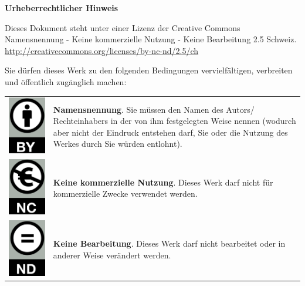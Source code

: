 \documentclass[11pt, twoside, a4paper]{book}		%
\begin{document}
\begin{titlepage}
	\clearpage
	\pagestyle{empty}
	\mbox{}
	\clearpage
	\pagestyle{empty}
	\centering
	
	\textbf{Urheberrechtlicher Hinweis}

	\hspace{1cm}

	Dieses Dokument steht unter einer Lizenz der Creative Commons Namensnennung - Keine kommerzielle Nutzung - Keine Bearbeitung 2.5 Schweiz.\\ \url{http://creativecommons.org/licenses/by-nc-nd/2.5/ch}
	
	\hspace{1cm}

	\RaggedRight Sie dürfen dieses Werk zu den folgenden Bedingungen vervielfältigen, verbreiten und öffentlich zugänglich machen:

	\begin{table}[h]
		\centering
		\small
		\begin{tabular}{c m{}}
			\raisebox{-.47\height} 	{\includegraphics[width=.1\textwidth]{png/CC_by_me}}
			&
			\textbf{Namensnennung}. Sie müssen den Namen des Autors/ Rechteinhabers in der von ihm festgelegten Weise nennen (wodurch aber nicht der Eindruck entstehen darf, Sie oder die Nutzung des Werkes durch Sie würden entlohnt). \\
			\rule{0pt}{9ex}%
			\raisebox{-.5\height} {\includegraphics[width=.1\textwidth]{png/CC_nc_me}}
			&
			\textbf{Keine kommerzielle Nutzung}. Dieses Werk darf nicht für kommerzielle Zwecke verwendet werden. \\
			\rule{0pt}{9ex}%
			\raisebox{-.5\height} {\includegraphics[width=.1\textwidth]{png/CC_nd_me}}
			&
			\textbf{Keine Bearbeitung}. Dieses Werk darf nicht bearbeitet oder in anderer Weise verändert werden. \\
		\end{tabular}
	\end{table}
	

\end{titlepage}
\end{document}

